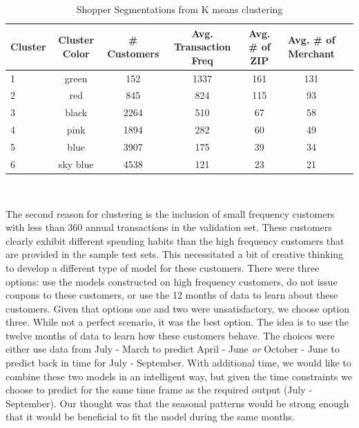 \documentclass[12pt]{article} %
\begin{document}
\begin{table}[h!]\footnotesize
\centering
\vspace{10pt}
\caption{Shopper Segmentations from K means clustering}
\begin{tabular}{l*{5}{c}r}
\hline
Cluster & Cluster Color & \# Customers & Avg. Transaction Freq & Avg. \# of ZIP &  Avg. \# of Merchant \\
\hline
1	& green& 152	&1337 	&161 &	131\\
2	&red&845	&824 	&115	&93\\
3	&black&2264	&510 	&67 &	58\\
4	&pink&1894	&282 	&60 	&49 \\
5	&blue&3907	&175 	&39 &	34\\
6	&sky blue&4538	&121 	&23 &	21\\
\hline
\end{tabular}\\
\label{table1}
\end{table}
The second reason for clustering is the inclusion of small frequency customers with less than 360 annual transactions in the validation set.  These customers clearly exhibit different spending habits than the high frequency customers that are provided in the sample test sets.  This necessitated a bit of creative thinking to develop a different type of model for these customers.  There were three options: use the models constructed on high frequency customers, do not issue coupons to these customers, or use the 12 months of data to learn about these customers.  Given that options one and two were unsatisfactory, we choose option three.  While not a perfect scenario, it was the best option.   The idea is to use the twelve months of data to learn how these customers behave.  The choices were either use data from July - March to predict April - June \emph{or}  October - June to predict back in time for July - September.  With additional time, we would like to combine these two models in an intelligent way, but given the time constraints we choose to predict for the same time frame as the required output (July - September).  Our thought was that the seasonal patterns would be strong enough that it would be beneficial to fit the model during the same months.
\end{document}
